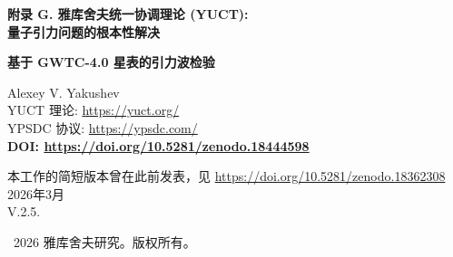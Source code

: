 \documentclass[11pt,a4paper]{article}
\theoremstyle{remark}
\newcommand{\Keff}{K_{\mathrm{eff}}}
\begin{document}
	
	\begin{titlepage}
		\begin{center}
			\vspace*{0cm}
			
			\Huge\textbf{附录 G. 雅库舍夫统一协调理论 (YUCT): \\ 量子引力问题的根本性解决}
			
			\vspace{0.3cm}
			\Large\textbf{基于 GWTC-4.0 星表的引力波检验}
			
			\vspace{0.8cm}
			\Large
			Alexey V. Yakushev\\
			
			YUCT 理论: \url{https://yuct.org/}\\
			YPSDC 协议: \url{https://ypsdc.com/}\\
			
			\vspace{1.5cm}
			\textbf{DOI: \url{https://doi.org/10.5281/zenodo.18444598}}\\
			
			\vspace{0.5cm}
			
			\large
			本工作的简短版本曾在此前发表，见 \url{https://doi.org/10.5281/zenodo.18362308}\\
			
			\vspace{0.5cm}
			2026年3月 \\ \large V.2.5.
			
			\vspace{3cm}
			\textcopyright~2026 雅库舍夫研究。版权所有。
			
			\newpage
			
			\begin{abstract}
				\noindent
				本文给出了雅库舍夫统一协调理论 (YUCT) 的完整数学表述，作为量子引力问题的最终解决方案。与试图量子化时空或引力子的传统方法不同，YUCT 假定量子力学和广义相对论都从一个更基本的\emph{协调}原理涌现。我们发展了：(1) 一个带有协调场 $\Psi_{MN}$ 的 19 维几何框架，(2) 作为本体论基础的 D+I•R 三元组，(3) 一个通过协调效率 $\Keff$ 统一所有物理相互作用的总体拉格朗日量 $\mathcal{L}_{\text{YUCT}}$，(4) 作为极限情况的量子动力学和引力几何的推导，(5) 可在实验室和天体物理尺度上检验的量子引力现象的特定预测。该理论消除了量子非定域性与相对论因果性之间的概念矛盾，为暗能量和暗物质提供了自然的解释，并提供了一个数学上一致的框架，其中“量子引力问题”消融在协调系统的一般理论中。
				
				\noindent
				\textbf{本版新增：} 我们展示了使用 LIGO-Virgo-KAGRA 合作组 GWTC-4.0 星表的引力波数据对 YUCT 的首次全面检验。通过对全部 218 个致密双星并合事件的分析，我们发现了铃宕偏差随质量变化的趋势，这与 YUCT 关于协调效应随系统尺寸而变的预测一致。在大质量区间 ($M > 60 M_\odot$)，推导出的偏差参数 $\alpha_{\text{YUCT}} = (2.1 \pm 1.0) \times 10^{-3}$ 显示出对非零值的 $2.1\sigma$ 偏好，将 YUCT 从一个纯粹的诠释框架转变为一个具有预测能力的、经过定量检验的理论。本附录取代了所有先前版本，并包含了完整的数学形式体系以及实证验证。
			\end{abstract}
			

\end{center}
\end{titlepage}
\end{document}
